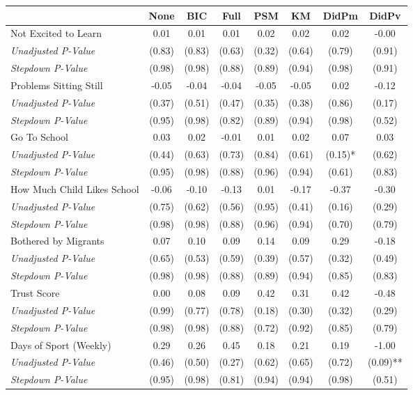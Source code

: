 \begin{tabular}{l c c c c c c c}
\toprule
 & None & BIC & Full & PSM & KM & DidPm & DidPv \\
\midrule
Not Excited to Learn & 0.01 & 0.01 & 0.01 & 0.02 & 0.02 & 0.02 & -0.00 \\
\quad \textit{Unadjusted P-Value} & (0.83) & (0.83) & (0.63) & (0.32) & (0.64) & (0.79) & (0.91) \\
\quad \textit{Stepdown P-Value} & (0.98) & (0.98) & (0.88) & (0.89) & (0.94) & (0.98) & (0.91) \\
Problems Sitting Still & -0.05 & -0.04 & -0.04 & -0.05 & -0.05 & 0.02 & -0.12 \\
\quad \textit{Unadjusted P-Value} & (0.37) & (0.51) & (0.47) & (0.35) & (0.38) & (0.86) & (0.17) \\
\quad \textit{Stepdown P-Value} & (0.95) & (0.98) & (0.82) & (0.89) & (0.94) & (0.98) & (0.52) \\
Go To School & 0.03 & 0.02 & -0.01 & 0.01 & 0.02 & 0.07 & 0.03 \\
\quad \textit{Unadjusted P-Value} & (0.44) & (0.63) & (0.73) & (0.84) & (0.61) & (0.15)* & (0.62) \\
\quad \textit{Stepdown P-Value} & (0.95) & (0.98) & (0.88) & (0.96) & (0.94) & (0.61) & (0.83) \\
How Much Child Likes School & -0.06 & -0.10 & -0.13 & 0.01 & -0.17 & -0.37 & -0.30 \\
\quad \textit{Unadjusted P-Value} & (0.75) & (0.62) & (0.56) & (0.95) & (0.41) & (0.16) & (0.29) \\
\quad \textit{Stepdown P-Value} & (0.98) & (0.98) & (0.88) & (0.96) & (0.94) & (0.70) & (0.79) \\
Bothered by Migrants & 0.07 & 0.10 & 0.09 & 0.14 & 0.09 & 0.29 & -0.18 \\
\quad \textit{Unadjusted P-Value} & (0.65) & (0.53) & (0.59) & (0.39) & (0.57) & (0.32) & (0.49) \\
\quad \textit{Stepdown P-Value} & (0.98) & (0.98) & (0.88) & (0.89) & (0.94) & (0.85) & (0.83) \\
Trust Score & 0.00 & 0.08 & 0.09 & 0.42 & 0.31 & 0.42 & -0.48 \\
\quad \textit{Unadjusted P-Value} & (0.99) & (0.77) & (0.78) & (0.18) & (0.30) & (0.32) & (0.29) \\
\quad \textit{Stepdown P-Value} & (0.98) & (0.98) & (0.88) & (0.72) & (0.92) & (0.85) & (0.79) \\
Days of Sport (Weekly) & 0.29 & 0.26 & 0.45 & 0.18 & 0.21 & 0.19 & -1.00 \\
\quad \textit{Unadjusted P-Value} & (0.46) & (0.50) & (0.27) & (0.62) & (0.65) & (0.72) & (0.09)** \\
\quad \textit{Stepdown P-Value} & (0.95) & (0.98) & (0.81) & (0.94) & (0.94) & (0.98) & (0.51) \\
\bottomrule
\end{tabular}
